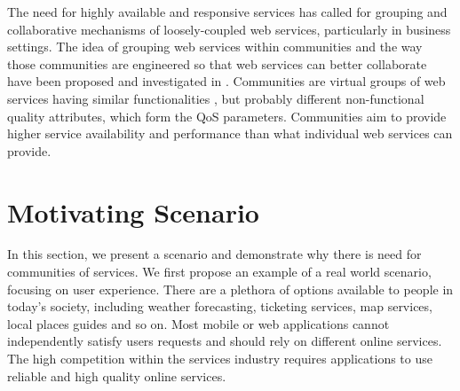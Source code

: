 The need for highly available and responsive services has called
for grouping and collaborative mechanisms of loosely-coupled web
services, particularly in business settings. The idea of grouping
web services within communities and the way those communities are
engineered so that web services can better collaborate have been
proposed and investigated in
\cite{DBLP:journals/ijebr/MaamarSTBB09,DBLP:journals/internet/BenatallahSD03,Rosario:2008:PQS:1512146.1512290}.
Communities are virtual groups of web services having similar
functionalities \cite{Zeng:2003:QDW:775152.775211,
Paik:2005:TSS:2229263.2230038,Medjahed05adynamic,10.1109/ARES.2008.7},
but probably different non-functional quality attributes, which
form the QoS parameters.
Communities aim to provide higher service
availability and performance than what individual web services can
provide.

\section{Motivating Scenario}\label{sec:motexample}

In this section, we present a scenario and demonstrate why there
is need for communities of services. We first propose an example
of a real world scenario, focusing on user experience. There are a
plethora of options available to people in today's society,
including weather forecasting, ticketing services, map services,
local places guides and so on. Most mobile or web applications
cannot independently satisfy users requests and should rely on
different online services. The high competition within the
services industry requires applications to use reliable and high
quality online services.


